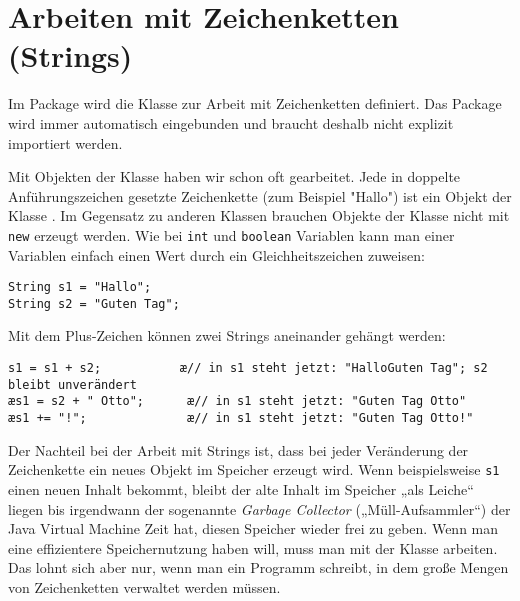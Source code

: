 \clearpage

\rehead[]{\textcolor{lightblue}{AvHG, Inf, My}}
\lohead[]{\textcolor{lightblue}{AvHG, Inf, My}}

\lstset{style=myJava}

\section{Arbeiten mit Zeichenketten (Strings)}


Im Package  wird die Klasse  zur Arbeit mit
Zeichenketten definiert. Das Package  wird immer
automatisch eingebunden und braucht deshalb nicht explizit importiert werden.

Mit Objekten der Klasse  haben wir schon oft gearbeitet. Jede in
doppelte Anführungszeichen gesetzte Zeichenkette (zum Beispiel "Hallo") ist ein
Objekt der Klasse . Im Gegensatz zu anderen Klassen brauchen
Objekte der Klasse  nicht mit \lstinline|new| erzeugt werden.
Wie bei \lstinline|int| und \lstinline|boolean| Variablen kann man einer
 Variablen einfach einen Wert durch ein Gleichheitszeichen
zuweisen:

\begin{lstlisting}
String s1 = "Hallo";
String s2 = "Guten Tag";
\end{lstlisting}

Mit dem Plus-Zeichen können zwei Strings aneinander gehängt werden:

\begin{lstlisting} 
s1 = s1 + s2;           æ// in s1 steht jetzt: "HalloGuten Tag"; s2 bleibt unverändert 
æs1 = s2 + " Otto";      æ// in s1 steht jetzt: "Guten Tag Otto"
æs1 += "!";              æ// in s1 steht jetzt: "Guten Tag Otto!"
\end{lstlisting}

\begin{framed}
Der Nachteil bei der Arbeit mit Strings ist, dass bei jeder Veränderung der
Zeichenkette ein neues Objekt im Speicher erzeugt wird. Wenn beispielsweise
\lstinline|s1| einen neuen Inhalt bekommt, bleibt der alte Inhalt im Speicher
„als Leiche“ liegen bis irgendwann der sogenannte \emph{Garbage Collector}
(„Müll-Aufsammler“) der Java Virtual Machine Zeit hat, diesen Speicher wieder
frei zu geben. Wenn man eine effizientere Speichernutzung haben will, muss man
mit der Klasse  arbeiten. Das lohnt sich aber nur, wenn
man ein Programm schreibt, in dem große Mengen von Zeichenketten verwaltet
werden müssen.
\end{framed}

